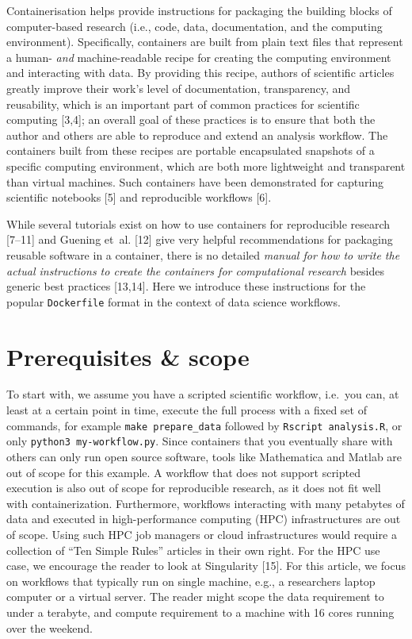\documentclass[10pt,letterpaper]{article}
\begin{document}
Containerisation helps provide instructions for packaging the building
blocks of computer-based research (i.e., code, data, documentation, and
the computing environment). Specifically, containers are built from
plain text files that represent a human- \emph{and} machine-readable
recipe for creating the computing environment and interacting with data.
By providing this recipe, authors of scientific articles greatly improve
their work's level of documentation, transparency, and reusability,
which is an important part of common practices for scientific computing
{[}3,4{]}; an overall goal of these practices is to ensure that both the
author and others are able to reproduce and extend an analysis workflow.
The containers built from these recipes are portable encapsulated
snapshots of a specific computing environment, which are both more
lightweight and transparent than virtual machines. Such containers have
been demonstrated for capturing scientific notebooks {[}5{]} and
reproducible workflows {[}6{]}.

While several tutorials exist on how to use containers for reproducible
research {[}7--11{]} and Guening et~al. {[}12{]} give very helpful
recommendations for packaging reusable software in a container, there is
no detailed \emph{manual for how to write the actual instructions to
create the containers for computational research} besides generic best
practices {[}13,14{]}. Here we introduce these instructions for the
popular \texttt{Dockerfile} format in the context of data science
workflows.

\hypertarget{prerequisites-scope}{%
\section{Prerequisites \& scope}\label{prerequisites-scope}}

To start with, we assume you have a scripted scientific workflow,
i.e.~you can, at least at a certain point in time, execute the full
process with a fixed set of commands, for example
\texttt{make\ prepare\_data} followed by \texttt{Rscript\ analysis.R},
or only \texttt{python3\ my-workflow.py}. Since containers that you
eventually share with others can only run open source software, tools
like Mathematica and Matlab are out of scope for this example. A
workflow that does not support scripted execution is also out of scope
for reproducible research, as it does not fit well with
containerization. Furthermore, workflows interacting with many petabytes
of data and executed in high-performance computing (HPC) infrastructures
are out of scope. Using such HPC job managers or cloud infrastructures
would require a collection of ``Ten Simple Rules'' articles in their own
right. For the HPC use case, we encourage the reader to look at
Singularity {[}15{]}. For this article, we focus on workflows that
typically run on single machine, e.g., a researchers laptop computer or
a virtual server. The reader might scope the data requirement to under a
terabyte, and compute requirement to a machine with 16 cores running
over the weekend.
\end{document}
